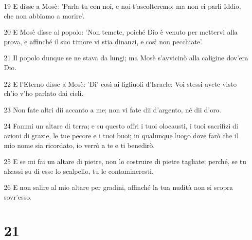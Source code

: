 \par 19 E disse a Mosè: 'Parla tu con noi, e noi t'ascolteremo; ma non ci parli Iddio, che non abbiamo a morire'.
\par 20 E Mosè disse al popolo: 'Non temete, poiché Dio è venuto per mettervi alla prova, e affinché il suo timore vi stia dinanzi, e così non pecchiate'.
\par 21 Il popolo dunque se ne stava da lungi; ma Mosè s'avvicinò alla caligine dov'era Dio.
\par 22 E l'Eterno disse a Mosè: 'Di' così ai figliuoli d'Israele: Voi stessi avete visto ch'io v'ho parlato dai cieli.
\par 23 Non fate altri dii accanto a me; non vi fate dii d'argento, né dii d'oro.
\par 24 Fammi un altare di terra; e su questo offri i tuoi olocausti, i tuoi sacrifizi di azioni di grazie, le tue pecore e i tuoi buoi; in qualunque luogo dove farò che il mio nome sia ricordato, io verrò a te e ti benedirò.
\par 25 E se mi fai un altare di pietre, non lo costruire di pietre tagliate; perché, se tu alzassi su di esse lo scalpello, tu le contamineresti.
\par 26 E non salire al mio altare per gradini, affinché la tua nudità non si scopra sovr'esso.

\chapter{21}

